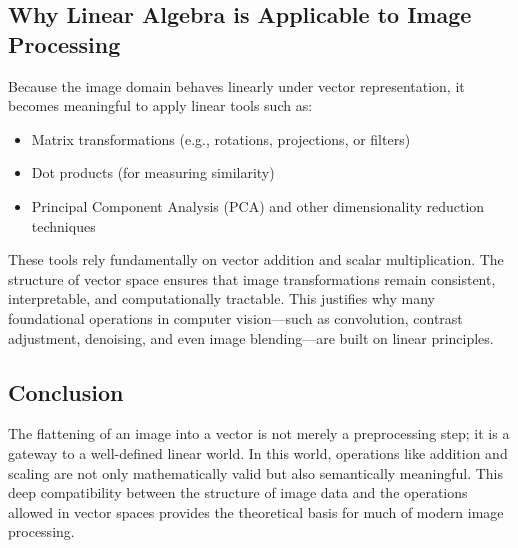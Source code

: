\subsection{Why Linear Algebra is Applicable to Image Processing}

Because the image domain behaves linearly under vector representation, it becomes meaningful to apply linear tools such as:
\begin{itemize}
	\item Matrix transformations (e.g., rotations, projections, or filters)
	\item Dot products (for measuring similarity)
	\item Principal Component Analysis (PCA) and other dimensionality reduction techniques
\end{itemize}

These tools rely fundamentally on vector addition and scalar multiplication. The structure of vector space ensures that image transformations remain consistent, interpretable, and computationally tractable. This justifies why many foundational operations in computer vision—such as convolution, contrast adjustment, denoising, and even image blending—are built on linear principles.

\subsection{Conclusion}

The flattening of an image into a vector is not merely a preprocessing step; it is a gateway to a well-defined linear world. In this world, operations like addition and scaling are not only mathematically valid but also semantically meaningful. This deep compatibility between the structure of image data and the operations allowed in vector spaces provides the theoretical basis for much of modern image processing.